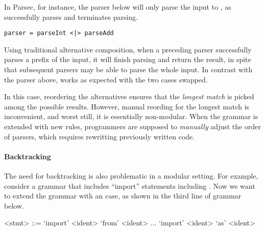 In Parsec, for instance, the parser below will only parse the input  to , as  successfully parses 
and terminates parsing.

\begin{lstlisting}[language=PlainCode]
parser = parseInt <|> parseAdd
\end{lstlisting}

Using traditional alternative composition, when a preceding parser successfully parses a prefix of the input, it will finish parsing and return the result, in spite that subsequent parsers may be able to parse the whole input.
In contrast with the parser above,  works as expected with the two cases swapped.

In this case, reordering the alternatives ensures that
the \emph{longest match} is picked among the possible results. However, manual reording for the longest match is inconvenient, and worst still, it is essentially non-modular. When the grammar is extended with new rules, programmers are supposed to \emph{manually} adjust
the order of parsers, which requires rewritting previously written code.

\paragraph{Backtracking} The need for backtracking is also problematic
in a modular setting. For example, consider a grammar that includes
``import'' statements including .
Now we want to extend the grammar with an  case, as shown in the third line of grammar below.

\setlength{\grammarindent}{5em}
\begin{grammar}
<stmt> ::= `import' <ident> `from' <ident>
    \alt ...
    \alt `import' <ident> `as' <ident>
\end{grammar}

